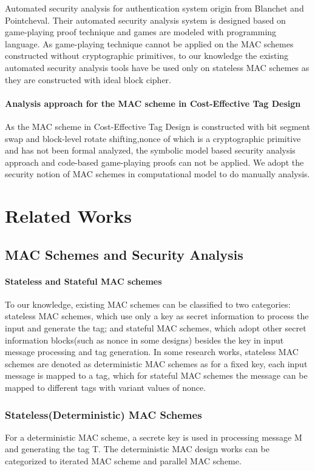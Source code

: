 \documentclass{article}
\begin{document}
Automated security analysis for authentication system origin from Blanchet and
Pointcheval\cite{blanchet2006automated}. Their automated security analysis system is designed based on
game-playing proof technique and games are modeled with programming language. As
game-playing technique cannot be applied on the MAC schemes constructed without
cryptographic primitives, to our knowledge the existing automated security analysis tools have be used only
on stateless MAC schemes as they are constructed with ideal block cipher.   
\paragraph{Analysis approach for the MAC scheme in Cost-Effective Tag Design}
As the MAC scheme in Cost-Effective Tag Design is constructed with bit segment
swap and block-level rotate shifting,nonce of which is a cryptographic primitive
and has not been formal analyzed, the symbolic model based security analysis
approach and code-based game-playing proofs can not be applied. We adopt the
security notion of MAC schemes in computational model to do manually analysis.

\section{Related Works} 
\subsection{MAC Schemes and Security Analysis}
\paragraph{Stateless and Stateful MAC schemes}
To our knowledge, existing MAC schemes can be classified to two categories:
stateless MAC schemes, which use only a key as secret information to process the
input and generate the tag; and stateful MAC schemes, which adopt other secret
information blocks(such as nonce in some designs) besides the key in input message
processing and tag generation. In some research works, stateless MAC schemes are denoted as deterministic MAC schemes as for a fixed key, each input message is mapped to a tag, which for stateful MAC schemes the message can be mapped to different tags with variant values of nonce.

\subsubsection{Stateless(Deterministic) MAC Schemes}
For a deterministic MAC scheme, a secrete key is used in processing message M and generating the tag T. The deterministic MAC design works can be categorized to iterated MAC scheme and parallel MAC scheme.
\end{document}

